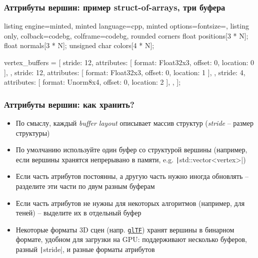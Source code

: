 \documentclass[10pt]{beamer}
\begin{document}
\begin{frame}[fragile]
\frametitle{Аттрибуты вершин: пример struct-of-arrays, три буфера}
\begin{tcblisting}{listing engine=minted, minted language=cpp, minted options={fontsize=\scriptsize}, listing only, colback=codebg, colframe=codebg, rounded corners}
float positions[3 * N];
float normals[3 * N];
unsigned char colors[4 * N];

vertex_buffers = [
    {
        stride: 12,
        attributes: [ { format: Float32x3, offset: 0, location: 0 } ],
    },
    {
        stride: 12,
        attributes: [ { format: Float32x3, offset: 0, location: 1 } ],
    },
    {
        stride: 4,
        attributes: [ { format:  Unorm8x4, offset: 0, location: 2 } ],
    },
];
\end{tcblisting}
\begin{center}
\end{center}
\end{frame}

\begin{frame}[fragile]
\frametitle{Аттрибуты вершин: как хранить?}
\begin{itemize}
\item По смыслу, каждый \textit{buffer layout} описывает массив структур (\textit{stride} -- размер структуры)
\pause
\item По умолчанию используйте один буфер со структурой вершины (например, если вершины хранятся непрерывано в памяти, e.g. \texttt|std::vector<vertex>|)
\pause
\item Если часть атрибутов постоянны, а другую часть нужно иногда обновлять -- разделите эти части по двум разным буферам
\pause
\item Если часть атрибутов не нужны для некоторых алгоритмов (например, для теней) -- выделите их в отдельный буфер
\pause
\item Некоторые форматы 3D сцен (напр. \href{https://registry.khronos.org/glTF/specs/2.0/glTF-2.0.html}{\texttt{glTF}}) хранят вершины в бинарном формате, удобном для загрузки на GPU: поддерживают несколько буферов, разный \texttt|stride|, и разные форматы атрибутов
\end{itemize}
\end{frame}
\end{document}
